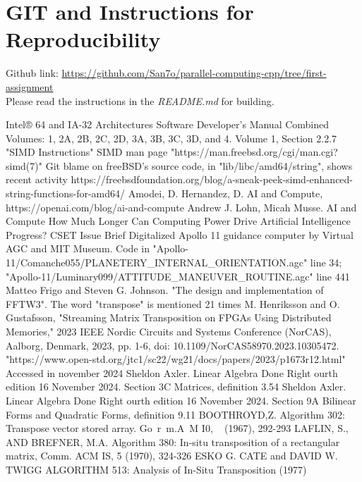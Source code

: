 \documentclass[conference]{IEEEtran}
\begin{document}
\section{GIT and Instructions for Reproducibility}

Github link: \href{https://github.com/San7o/parallel-computing-cpp/tree/first-assignment}{https://github.com/San7o/parallel-computing-cpp/tree/first-assignment} \\
Please read the instructions in the \textit{README.md} for building.

\begin{thebibliography}{00}
 Intel® 64 and IA-32 Architectures Software Developer’s Manual Combined Volumes: 1, 2A, 2B, 2C, 2D, 3A, 3B, 3C, 3D, and 4. Volume 1, Section 2.2.7 "SIMD Instructions"
 SIMD man page "https://man.freebsd.org/cgi/man.cgi?simd(7)"
 Git blame on freeBSD's source code, in "lib/libc/amd64/string", shows recent activity
 https://freebsdfoundation.org/blog/a-sneak-peek-simd-enhanced-string-functions-for-amd64/
 Amodei, D. Hernandez, D. AI and Compute, https://openai.com/blog/ai-and-compute
 Andrew J. Lohn, Micah Musse. AI and Compute How Much Longer Can Computing Power Drive Artificial Intelligence Progress? CSET Issue Brief
 Digitalized Apollo 11 guidance computer by Virtual AGC and MIT Museum. Code in "Apollo-11/Comanche055/PLANETERY\_INTERNAL\_ORIENTATION.agc" line 34; "Apollo-11/Luminary099/ATTITUDE\_MANEUVER\_ROUTINE.agc" line 441
 Matteo Frigo and Steven G. Johnson. "The design and implementation of FFTW3". The word "transpose" is mentioned 21 times
 M. Henriksson and O. Gustafsson, "Streaming Matrix Transposition on FPGAs Using Distributed Memories," 2023 IEEE Nordic Circuits and Systems Conference (NorCAS), Aalborg, Denmark, 2023, pp. 1-6, doi: 10.1109/NorCAS58970.2023.10305472.
 "https://www.open-std.org/jtc1/sc22/wg21/docs/papers/2023/p1673r12.html" Accessed in november 2024
 Sheldon Axler. Linear Algebra Done Right ourth edition
16 November 2024. Section 3C Matrices, definition 3.54
 Sheldon Axler. Linear Algebra Done Right ourth edition
16 November 2024. Section 9A Bilinear Forms and Quadratic Forms, definition 9.11
 BOOTHROYD,Z. Algorithm 302: Transpose vector stored array. Go~r~m.A~M I0, ~ (1967),
292-293
 LAFLIN, S., AND BREFNER, M.A. Algorithm 380: In-situ transposition of a rectangular
matrix, Comm. ACM IS, 5 (1970), 324-326
 ESKO G. CATE and DAVID W. TWIGG ALGORITHM 513: Analysis of In-Situ Transposition (1977)

\end{thebibliography}
\end{document}
